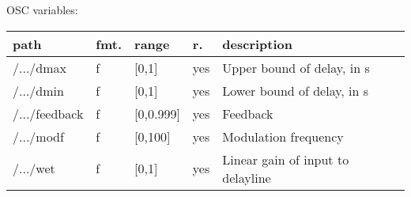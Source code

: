 \begin{snugshade}
{\footnotesize
\label{osctab:tascarapflanger}
OSC variables:
\nopagebreak

\begin{tabularx}{\textwidth}{llllX}
\hline
path & fmt. & range & r. & description\\
\hline
/.../dmax & f & [0,1] & yes & Upper bound of delay, in s\\
/.../dmin & f & [0,1] & yes & Lower bound of delay, in s\\
/.../feedback & f & [0,0.999] & yes & Feedback\\
/.../modf & f & [0,100] & yes & Modulation frequency\\
/.../wet & f & [0,1] & yes & Linear gain of input to delayline\\
\hline
\end{tabularx}
}
\end{snugshade}
